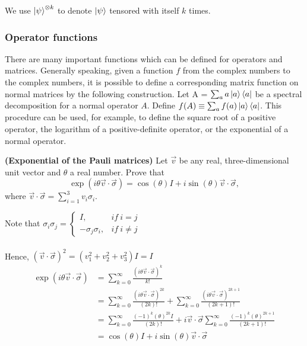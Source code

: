 We use $\ket{\psi}^{\otimes k}$ to denote $\ket{\psi}$ tensored with itself $k$ times.

\subsubsection{Operator functions}
There are many important functions which can be defined for operators and matrices. Generally speaking, given a function $f$ from the complex numbers to the complex numbers, it is possible to define a corresponding matrix function on normal matrices by the following construction. Let A = $\sum_{a}{a\ket{a}\bra{a}}$ be a spectral decomposition for a normal operator $A$. Define $f(A) \equiv \sum_{a}{f(a)\ket{a}\bra{a}}$. This procedure can be used, for example, to define the square root of a positive operator, the logarithm of a positive-definite operator, or the exponential of a normal operator.
\begin{exercise}
    \textbf{(Exponential of the Pauli matrices)} Let $\vec{v}$ be any real, three-dimensional unit vector and $\theta$ a real number. Prove that
        $$\exp\left(i\theta\vec{v}\cdot\vec{\sigma}\right) = \cos(\theta)I + i\sin(\theta)\vec{v}\cdot\vec{\sigma},$$
    where $\vec{v}\cdot\vec{\sigma} = \sum_{i = 1}^{3}v_i\sigma_i$.
\end{exercise}
\begin{solution}
    Note that $\sigma_i\sigma_j = \left\{
                        \begin{matrix}
                            I, & if\ i = j \\ 
                            -\sigma_j\sigma_i, & if\ i \neq j
                        \end{matrix}\right.$
    \\\\Hence, $(\vec{v}\cdot\vec{\sigma})^2 = (v_1^2 + v_2^2 + v_3^2)I = I$
    \begin{equation*}
    \begin{split}
        \exp\left(i\theta\vec{v}\cdot\vec{\sigma}\right) & = \sum_{k = 0}^{\infty}{\frac{(i\theta\vec{v}\cdot\vec{\sigma})^k}{k!}} \\
        & = \sum_{k = 0}^{\infty}{\frac{(i\theta\vec{v}\cdot\vec{\sigma})^{2k}}{(2k)!}} + \sum_{k = 0}^{\infty}{\frac{(i\theta\vec{v}\cdot\vec{\sigma})^{2k+1}}{(2k+1)!}} \\
        & = \sum_{k = 0}^{\infty}{\frac{(-1)^k(\theta)^{2k}I}{(2k)!}} + i\vec{v}\cdot\vec{\sigma}\sum_{k = 0}^{\infty}{\frac{(-1)^k(\theta)^{2k+1}}{(2k+1)!}} \\
        & = \cos(\theta)I + i\sin(\theta)\vec{v}\cdot\vec{\sigma}
    \end{split}
    \end{equation*}
\end{solution}
\vspace{1em}

